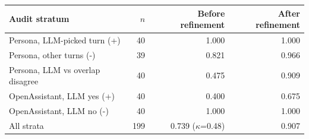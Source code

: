 \begin{tabular}{lrrr}
\toprule
Audit stratum & $n$ & Before refinement & After refinement \\
\midrule
Persona, LLM-picked turn (+) & 40 & 1.000 & 1.000 \\
Persona, other turns (-) & 39 & 0.821 & 0.966 \\
Persona, LLM vs overlap disagree & 40 & 0.475 & 0.909 \\
OpenAssistant, LLM yes (+) & 40 & 0.400 & 0.675 \\
OpenAssistant, LLM no (-) & 40 & 1.000 & 1.000 \\
\midrule All strata & 199 & 0.739 ($\kappa$=0.48) & 0.907 \\
\bottomrule
\end{tabular}
